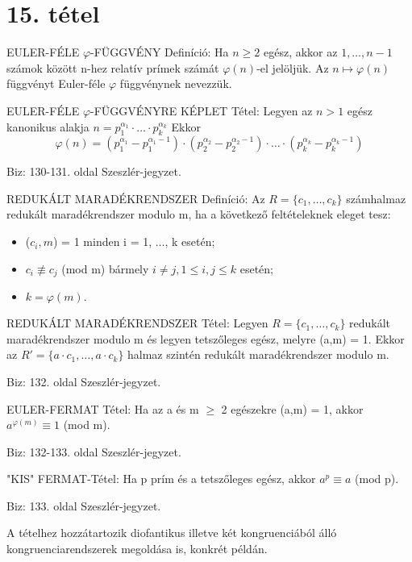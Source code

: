 \section{15. tétel}

\begin{shaded}
EULER-FÉLE $\varphi$-FÜGGVÉNY Definíció: Ha $n \geq 2$ egész, akkor az $1,\ldots,n-1$ számok között n-hez relatív prímek számát $\varphi(n)$-el jelöljük. Az $n\mapsto\varphi(n)$ függvényt Euler-féle $\varphi$ függvénynek nevezzük.
\end{shaded}
\begin{framed}
EULER-FÉLE $\varphi$-FÜGGVÉNYRE KÉPLET Tétel: Legyen az $n > 1$ egész kanonikus alakja $n = p_1^{\alpha_1} \cdot \ldots \cdot p_k^{\alpha_k}$ Ekkor $$\varphi(n) = \left(p_1^{\alpha_1} - p_1^{\alpha_1-1}\right) \cdot \left(p_2^{\alpha_2} - p_2^{\alpha_2-1}\right) \cdot \ldots \cdot
\left(p_k^{\alpha_k} - p_k^{\alpha_k-1}\right)$$
\end{framed}
\begin{leftbar}
Biz: 130-131. oldal Szeszlér-jegyzet.
\end{leftbar}
\begin{shaded}
REDUKÁLT MARADÉKRENDSZER Definíció: Az $R = \{c_1, \ldots, c_k\}$ számhalmaz redukált maradékrendszer modulo m, ha a következő feltételeknek eleget tesz:
\begin{itemize}
\item ($c_i, m$) = 1 minden i = 1, $\ldots$, k esetén;
\item $c_i \not \equiv c_j$ (mod m) bármely $i \neq j, 1 \leq i, j \leq k$ esetén;
\item $k = \varphi(m).$
\end{itemize}
\end{shaded}
\begin{framed}
REDUKÁLT MARADÉKRENDSZER Tétel: Legyen $R = \{c_1, \ldots, c_k\}$ redukált maradékrendszer modulo m és legyen tetszőleges egész, melyre (a,m) = 1. Ekkor az $R' = \{a\cdot c_1, \ldots, a \cdot c_k\}$ halmaz szintén redukált maradékrendszer modulo m.
\end{framed}
\begin{leftbar}
Biz: 132. oldal Szeszlér-jegyzet.
\end{leftbar}
\begin{framed}
EULER-FERMAT Tétel: Ha az a és m $\geq$ 2 egészekre (a,m) = 1, akkor $a^{\varphi(m)} \equiv 1$ (mod m).
\end{framed}
\begin{leftbar}
Biz: 132-133. oldal Szeszlér-jegyzet.
\end{leftbar}
\begin{framed}
"KIS" FERMAT-Tétel: Ha p prím és a tetszőleges egész, akkor $a^p \equiv a$ (mod p).
\end{framed}
\begin{leftbar}
Biz: 133. oldal Szeszlér-jegyzet.
\end{leftbar}
A tételhez hozzátartozik diofantikus illetve két kongruenciából álló kongruenciarendszerek megoldása is, konkrét példán.
